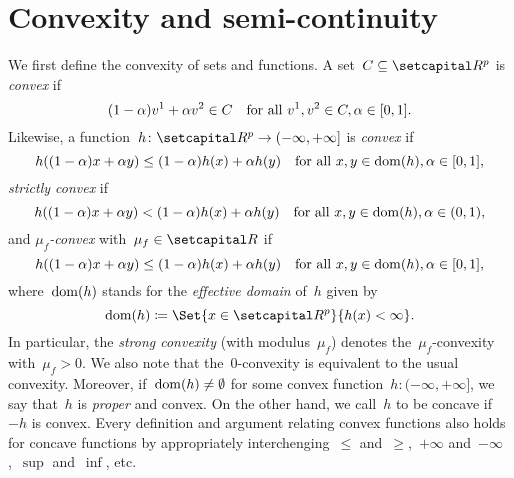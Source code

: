 \documentclass[../main]{subfiles}
\begin{document}
\section{Convexity and semi-continuity} 
We first define the convexity of sets and functions.
A set~$C \subseteq \setR^p$ is \emph{convex} if
\begin{equation}
    (1 - \alpha) v^1 + \alpha v^2 \in C \quad \text{for all~$v^1, v^2 \in C, \alpha \in [0, 1]$}
.\end{equation} 
Likewise, a function~$h \colon \setR^p \to (-\infty, +\infty]$ is \emph{convex} if
\begin{equation}
    h((1 - \alpha) x + \alpha y) \le (1 - \alpha) h(x) + \alpha h(y) \quad \text{for all~$x, y \in \operatorname{dom}(h), \alpha \in [0, 1]$}
,\end{equation}
\emph{strictly convex} if
\begin{equation}
    h((1 - \alpha) x + \alpha y) < (1 - \alpha) h(x) + \alpha h(y) \quad \text{for all~$x, y \in \operatorname{dom}(h), \alpha \in (0, 1)$}
,\end{equation} 
and \emph{$\mu_f$-convex} with~$\mu_f \in \setR$ if
\begin{equation}
    h((1 - \alpha) x + \alpha y) \le (1 - \alpha) h(x) + \alpha h(y) \quad \text{for all~$x, y \in \operatorname{dom}(h), \alpha \in [0, 1]$}
,\end{equation} 
where~$\operatorname{dom}(h)$ stands for the \emph{effective domain} of~$h$ given by
\begin{equation}
    \dom(h) \coloneqq \Set{x \in \setR^p}{h(x) < \infty}
.\end{equation} 
In particular, the \emph{strong convexity} (with modulus~$\mu_f$) denotes the~$\mu_f$-convexity with~$\mu_f > 0$.
We also note that the~$0$-convexity is equivalent to the usual convexity.
Moreover, if~$\operatorname{dom}(h) \neq \emptyset$ for some convex function~$h \colon (- \infty, + \infty]$, we say that~$h$ is \emph{proper} and convex.
On the other hand, we call~$h$ to be concave if~$- h$ is convex.
Every definition and argument relating convex functions also holds for concave functions by appropriately interchenging~$\le$ and~$\ge$,~$+ \infty$ and~$- \infty$,~$\sup$ and~$\inf$, etc.
\end{document}
